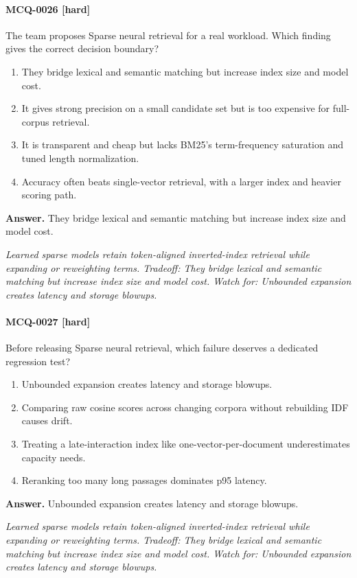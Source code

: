 \paragraph{MCQ-0026 [hard]} The team proposes Sparse neural retrieval for a real workload. Which finding gives the correct decision boundary?
\begin{enumerate}[label=\Alph*.]
\item They bridge lexical and semantic matching but increase index size and model cost.
\item It gives strong precision on a small candidate set but is too expensive for full-corpus retrieval.
\item It is transparent and cheap but lacks BM25's term-frequency saturation and tuned length normalization.
\item Accuracy often beats single-vector retrieval, with a larger index and heavier scoring path.
\end{enumerate}
\noindent\textbf{Answer.} They bridge lexical and semantic matching but increase index size and model cost.
\par\textit{Learned sparse models retain token-aligned inverted-index retrieval while expanding or reweighting terms. Tradeoff: They bridge lexical and semantic matching but increase index size and model cost. Watch for: Unbounded expansion creates latency and storage blowups.}
\paragraph{MCQ-0027 [hard]} Before releasing Sparse neural retrieval, which failure deserves a dedicated regression test?
\begin{enumerate}[label=\Alph*.]
\item Unbounded expansion creates latency and storage blowups.
\item Comparing raw cosine scores across changing corpora without rebuilding IDF causes drift.
\item Treating a late-interaction index like one-vector-per-document underestimates capacity needs.
\item Reranking too many long passages dominates p95 latency.
\end{enumerate}
\noindent\textbf{Answer.} Unbounded expansion creates latency and storage blowups.
\par\textit{Learned sparse models retain token-aligned inverted-index retrieval while expanding or reweighting terms. Tradeoff: They bridge lexical and semantic matching but increase index size and model cost. Watch for: Unbounded expansion creates latency and storage blowups.}
